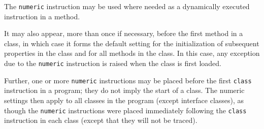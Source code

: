 The \texttt{numeric} instruction may be used where needed as a
dynamically executed instruction in a method.
 
It may also appear, more than once if necessary, before the first
method in a class, in which case it forms the default setting for the
initialization of subsequent properties in the class and for all methods
in the class.  In this case, any exception due to the \texttt{numeric}
instruction is raised when the class is first loaded.
 
Further, one or more \texttt{numeric} instructions may be placed
before the first \texttt{class} instruction in a program; they do
not imply the start of a class.  The numeric settings then apply
to all classes in the program (except interface classes), as
though the \texttt{numeric} instructions were placed immediately
following the \texttt{class} instruction in each class (except that
they will not be traced).
